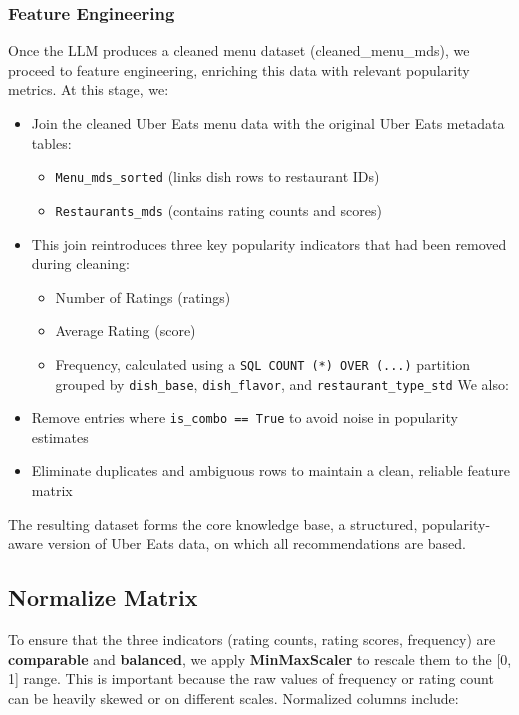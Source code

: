 \documentclass[
  11pt,
  a4paper,
  DIV=11,
  numbers=noendperiod]{scrartcl}
\providecommand{\tightlist}{%
  \setlength{\itemsep}{0pt}\setlength{\parskip}{0pt}}\usepackage{longtable,booktabs,array}
\begin{document}
\subsubsection{Feature Engineering}\label{feature-engineering}

Once the LLM produces a cleaned menu dataset (cleaned\_menu\_mds), we
proceed to feature engineering, enriching this data with relevant
popularity metrics. At this stage, we:

\begin{itemize}
\tightlist
\item
  Join the cleaned Uber Eats menu data with the original Uber Eats
  metadata tables:

  \begin{itemize}
  \tightlist
  \item
    \texttt{Menu\_mds\_sorted} (links dish rows to restaurant IDs)
  \item
    \texttt{Restaurants\_mds} (contains rating counts and scores)
  \end{itemize}
\item
  This join reintroduces three key popularity indicators that had been
  removed during cleaning:

  \begin{itemize}
  \tightlist
  \item
    Number of Ratings (ratings)
  \item
    Average Rating (score)
  \item
    Frequency, calculated using a \texttt{SQL\ COUNT\ (*)\ OVER\ (...)}
    partition grouped by \texttt{dish\_base}, \texttt{dish\_flavor}, and
    \texttt{restaurant\_type\_std} We also:
  \end{itemize}
\item
  Remove entries where \texttt{is\_combo\ ==\ True} to avoid noise in
  popularity estimates
\item
  Eliminate duplicates and ambiguous rows to maintain a clean, reliable
  feature matrix
\end{itemize}

The resulting dataset forms the core knowledge base, a structured,
popularity-aware version of Uber Eats data, on which all recommendations
are based.

\subsection{Normalize Matrix}\label{normalize-matrix}

To ensure that the three indicators (rating counts, rating scores,
frequency) are \textbf{comparable} and \textbf{balanced}, we apply
\textbf{MinMaxScaler} to rescale them to the {[}0, 1{]} range. This is
important because the raw values of frequency or rating count can be
heavily skewed or on different scales. Normalized columns include:
\end{document}
